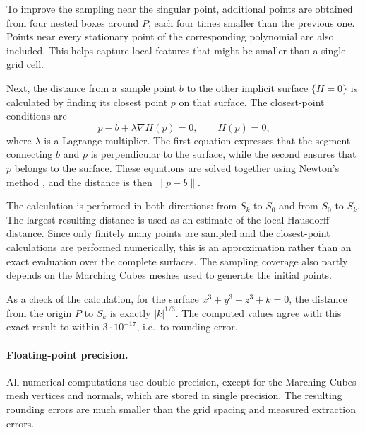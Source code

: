 \documentclass[12pt, a4paper]{article}
\theoremstyle{plain}
\theoremstyle{definition}
\theoremstyle{remark}
\theoremstyle{definition}
\begin{document}
To improve the sampling near the singular point, additional
points are obtained from four nested boxes around $P$, each
four times smaller than the previous one. Points near every
stationary point of the corresponding polynomial are also
included. This helps capture local features that might be
smaller than a single grid cell.

Next, the distance from a sample point $b$ to the other implicit
surface $\{H=0\}$ is calculated by finding its closest point $p$
on that surface. The closest-point conditions are
\[
p-b+\lambda\nabla H(p)=0,\qquad H(p)=0,
\]
where $\lambda$ is a Lagrange multiplier. The first equation
expresses that the segment connecting $b$ and $p$ is
perpendicular to the surface, while the second ensures that
$p$ belongs to the surface. These equations are solved together
using Newton's method \cite{nocedal2006numerical}, and the
distance is then $\|p-b\|$.

The calculation is performed in both directions: from $S_k$
to $S_0$ and from $S_0$ to $S_k$. The largest resulting
distance is used as an estimate of the local Hausdorff distance.
Since only finitely many points are sampled and the closest-point
calculations are performed numerically, this is an approximation
rather than an exact evaluation over the complete surfaces.
The sampling coverage also partly depends on the Marching Cubes
meshes used to generate the initial points.

As a check of the calculation, for the surface
$x^3+y^3+z^3+k=0$, the distance from the origin $P$ to $S_k$
is exactly $|k|^{1/3}$. The computed values agree with this
exact result to within $3\cdot10^{-17}$, i.e.\ to rounding error.

\paragraph{Floating-point precision.}
All numerical computations use double precision, except for the Marching Cubes mesh vertices and normals, which are stored in single precision. 
The resulting rounding errors are much smaller than the grid spacing and measured extraction errors.
\end{document}
